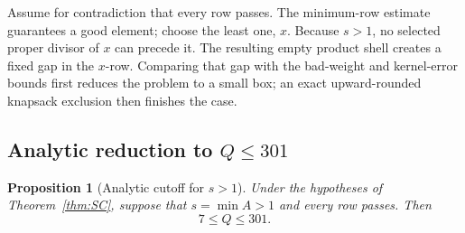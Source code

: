 \documentclass[11pt]{article}
\newtheorem{proposition}[theorem]{Proposition}
\theoremstyle{definition}
\theoremstyle{remark}
\begin{document}
Assume for contradiction that every row passes.  The minimum-row estimate
guarantees a good element; choose the least one, \(x\).  Because \(s>1\),
no selected proper divisor of \(x\) can precede it.  The resulting empty
product shell creates a fixed gap in the \(x\)-row.  Comparing that gap with
the bad-weight and kernel-error bounds first reduces the problem to a small
box; an exact upward-rounded knapsack exclusion then finishes the case.

\subsection{Analytic reduction to \texorpdfstring{\(Q\le301\)}{Q <= 301}}

\begin{proposition}[Analytic cutoff for \(s>1\)]
\label{prop:s-positive-cutoff}
Under the hypotheses of Theorem~\ref{thm:SC}, suppose that \(s=\min A>1\)
and every row passes.  Then
\[
 7\le Q\le301.
\]
\end{proposition}
\end{document}
